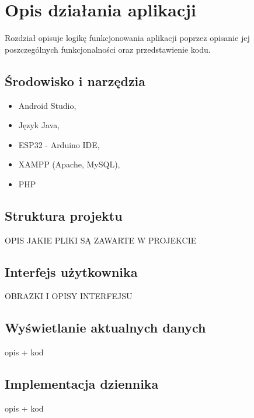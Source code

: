 \chapter{Opis działania aplikacji}

Rozdział opisuje logikę funkcjonowania aplikacji poprzez opisanie jej poszczególnych funkcjonalności oraz przedstawienie kodu.

\section{Środowisko i narzędzia}
\begin{itemize}
    \item Android Studio,
    \item Język Java,
    \item ESP32 - Arduino IDE,
    \item XAMPP (Apache, MySQL),
    \item PHP
\end{itemize}

\section{Struktura projektu}
OPIS JAKIE PLIKI SĄ ZAWARTE W PROJEKCIE

\section{Interfejs użytkownika}
OBRAZKI I OPISY INTERFEJSU

\section{Wyświetlanie aktualnych danych}
opis + kod

\section{Implementacja dziennika}
opis + kod


